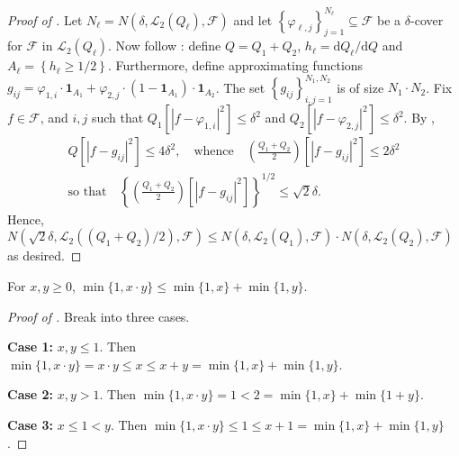 \begin{proof}[Proof of ]
Let \(N_{\ell} = N \left( \delta, \mathscr{L}_{2} \left( Q_{\ell} \right),
\mathcal{F} \right)\) and let \(\left\{ \varphi_{\ell, j} \right\}_{j =
1}^{N_{\ell}} \subseteq \mathcal{F}\) be a \(\delta\)-cover for
\(\mathcal{F}\) in \(\mathscr{L}_{2} \left( Q_{\ell} \right)\).
Now follow : define \(Q = Q_{1} + Q_{2}\),
\(h_{\ell} = \mathrm{d} Q_{\ell} / \mathrm{d} Q\) and \(A_{\ell} = \left\{
h_{\ell} \geq 1 / 2 \right\}\).
Furthermore, define approximating functions
\(g_{i j} = \varphi_{1, i} \cdot \mathbf{1}_{A_{1}} + \varphi_{2, j} \cdot
\left( 1 - \mathbf{1}_{A_{1}} \right) \cdot \mathbf{1}_{A_{2}}\).
The set \(\left\{ g_{i j} \right\}_{i, j = 1}^{N_{1}, N_{2}}\) is of size
\(N_{1} \cdot N_{2}\).
Fix \(f \in \mathcal{F}\), and \(i, j\) such that \(Q_{1} \left[ \left| f -
\varphi_{1, i} \right|^{2} \right] \leq \delta^{2}\) and
\(Q_{2} \left[ \left| f - \varphi_{2, j} \right|^{2} \right] \leq \delta^{2}\).
By ,
\begin{equation*}
  \begin{gathered}
    Q \left[ \left| f - g_{i j} \right|^{2} \right] \leq 4 \delta^{2},
    \quad \text{whence} \quad \left( \frac{Q_{1} + Q_{2}}{2} \right) \left[
    \left| f - g_{i j} \right|^{2} \right] \leq 2 \delta^{2} \\
    \text{so that} \quad \left\{ \left( \frac{Q_{1} + Q_{2}}{2} \right) \left[
    \left| f - g_{i j} \right|^{2} \right] \right\}^{1 / 2} \leq \sqrt{2}
    \delta.
  \end{gathered}
\end{equation*}
Hence, \(N \left( \sqrt{2} \delta, \mathscr{L}_{2} \left( \left( Q_{1} + Q_{2}
\right) / 2 \right), \mathcal{F} \right) \leq N \left( \delta, \mathscr{L}_{2}
\left( Q_{1} \right), \mathcal{F} \right) \cdot N \left( \delta, \mathscr{L}_{2}
\left( Q_{2} \right), \mathcal{F} \right)\) as desired.
\end{proof}

\begin{lemma}
\label{lem--xy-bound-xpy}
For \(x, y \geq 0\), \(\min \{1, x \cdot y\} \leq \min \{1, x\} + \min \{1,
y\}\).
\end{lemma}

\begin{proof}[Proof of ]
Break into three cases.

\textbf{Case 1:} \(x, y \leq 1\).
Then \(\min \{1, x \cdot y\} = x \cdot y \leq x \leq x + y = \min \{1, x\} +
\min \{1, y\}\).

\textbf{Case 2:} \(x, y > 1\).
Then \(\min \{1, x \cdot y\} = 1 < 2 = \min \{1, x\} + \min \{1 + y\}\).

\textbf{Case 3:} \(x \leq 1 < y\).
Then \(\min \{1, x \cdot y\} \leq 1 \leq x + 1 = \min \{1,
x\} + \min \{1, y\}\).
\end{proof}


